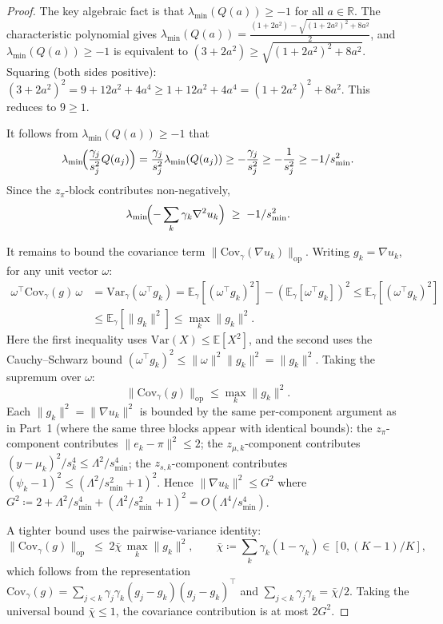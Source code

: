 \documentclass[11pt]{article}
\newcommand{\R}{\mathbb{R}}
\newcommand{\E}{\mathbb{E}}
\begin{document}
\begin{proof}
The key algebraic fact is that $\lambda_{\min}(Q(a)) \ge -1$ for all $a \in \R$.
The characteristic polynomial gives
$\lambda_{\min}(Q(a)) = \frac{(1+2a^2)-\sqrt{(1+2a^2)^2+8a^2}}{2}$,
and $\lambda_{\min}(Q(a)) \ge -1$ is equivalent to
$(3+2a^2) \ge \sqrt{(1+2a^2)^2+8a^2}$.
Squaring (both sides positive):
$(3+2a^2)^2 = 9+12a^2+4a^4 \ge 1+12a^2+4a^4 = (1+2a^2)^2+8a^2$.
This reduces to $9 \ge 1$.

It follows from $\lambda_{\min}(Q(a)) \ge -1$ that
\[
  \lambda_{\min}\!\Bigl(\frac{\gamma_j}{s_j^2} Q(a_j)\Bigr)
  = \frac{\gamma_j}{s_j^2}\lambda_{\min}(Q(a_j))
  \ge -\frac{\gamma_j}{s_j^2}
  \ge -\frac{1}{s_j^2}
  \ge -1/s_{\min}^2.
\]
Since the $z_\pi$-block contributes non-negatively,
\begin{equation}\label{eq:step1_bound}
  \lambda_{\min}\!\Bigl(-\sum_k \gamma_k \nabla^2 u_k\Bigr) \;\ge\; -1/s_{\min}^2.
\end{equation}

It remains to bound the covariance term
$\|\mathrm{Cov}_\gamma(\nabla u_k)\|_{\mathrm{op}}$.
Writing $g_k = \nabla u_k$, for any unit vector $\omega$:
\begin{align*}
  \omega^\top \mathrm{Cov}_\gamma(g)\, \omega
  &= \mathrm{Var}_\gamma(\omega^\top g_k)
   = \E_\gamma[(\omega^\top g_k)^2] - (\E_\gamma[\omega^\top g_k])^2
   \le \E_\gamma[(\omega^\top g_k)^2] \\
  &\le \E_\gamma[\|g_k\|^2]
   \le \max_k \|g_k\|^2.
\end{align*}
Here the first inequality uses $\mathrm{Var}(X) \le \E[X^2]$, and the
second uses the Cauchy--Schwarz bound $(\omega^\top g_k)^2 \le \|\omega\|^2\|g_k\|^2
= \|g_k\|^2$. Taking the supremum over $\omega$:
\[
  \|\mathrm{Cov}_\gamma(g)\|_{\mathrm{op}}
  \le \max_k \|g_k\|^2.
\]
Each $\|g_k\|^2 = \|\nabla u_k\|^2$ is bounded by the same
per-component argument as in Part~1
(where the same three blocks appear with identical bounds):
the $z_\pi$-component contributes $\|e_k-\pi\|^2 \le 2$;
the $z_{\mu,k}$-component contributes $(y-\mu_k)^2/s_k^4 \le \Lambda^2/s_{\min}^4$;
the $z_{s,k}$-component contributes $(\psi_k-1)^2 \le (\Lambda^2/s_{\min}^2+1)^2$.
Hence $\|\nabla u_k\|^2 \le G^2$ where
$G^2 \coloneqq 2 + \Lambda^2/s_{\min}^4 + (\Lambda^2/s_{\min}^2+1)^2
= O(\Lambda^4/s_{\min}^4)$.

A tighter bound uses the pairwise-variance identity:
\begin{equation}\label{eq:pairwise_identity}
  \|\mathrm{Cov}_\gamma(g)\|_{\mathrm{op}}
  \;\le\; 2\bar\chi\,\max_k\|g_k\|^2,
  \qquad
  \bar\chi \coloneqq \sum_k\gamma_k(1-\gamma_k)\in[0,(K{-}1)/K],
\end{equation}
which follows from the representation
$\mathrm{Cov}_\gamma(g)
= \sum_{j<k}\gamma_j\gamma_k(g_j-g_k)(g_j-g_k)^\top$
and $\sum_{j<k}\gamma_j\gamma_k = \bar\chi/2$.
Taking the universal bound $\bar\chi \le 1$, the covariance
contribution is at most $2G^2$.


\end{proof}
\end{document}
